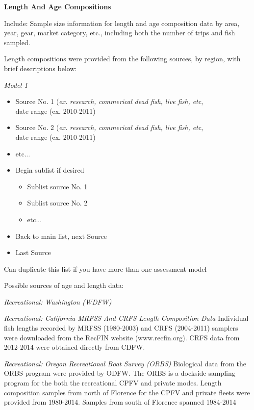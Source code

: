 \documentclass[12pt,]{article}
\begin{document}
\textbf{Length And Age Compositions}

Include: Sample size information for length and age composition data by
area, year, gear, market category, etc., including both the number of
trips and fish sampled.

Length compositions were provided from the following sources, by region,
with brief descriptions below:

\emph{Model 1}

\begin{itemize}[noitemsep,nolistsep,topsep=0pt]
  \item Source No. 1 (\emph{ex. research, commerical dead fish, live fish, etc},\\     
        date range (ex. 2010-2011)
  \item Source No. 2 (\emph{ex. research, commerical dead fish, live fish, etc},\\      
        date range (ex. 2010-2011) 
  \item etc...      
  \item Begin sublist if desired 
    \begin{itemize}[noitemsep,nolistsep]
      \item Sublist source No. 1     
      \item Sublist source No. 2        
      \item etc...     
    \end{itemize}
  \item Back to main list, next Source     
  \item Last Source     
\end{itemize}

Can duplicate this list if you have more than one assessment model

Possible sources of age and length data:

\emph{Recreational: Washington (WDFW)}

\emph{Recreational: California MRFSS And CRFS Length Composition Data}
Individual fish lengths recorded by MRFSS (1980-2003) and CRFS
(2004-2011) samplers were downloaded from the RecFIN website
(www.recfin.org). CRFS data from 2012-2014 were obtained directly from
CDFW.

\emph{Recreational: Oregon Recreational Boat Survey (ORBS)} Biological
data from the ORBS program were provided by ODFW. The ORBS is a dockside
sampling program for the both the recreational CPFV and private modes.
Length composition samples from north of Florence for the CPFV and
private fleets were provided from 1980-2014. Samples from south of
Florence spanned 1984-2014
\end{document}
